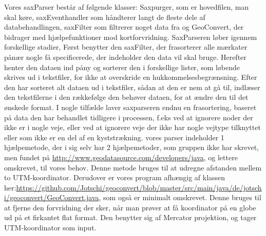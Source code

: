 Vores saxParser  består af følgende klasser: Saxpurger, som er hovedfilen, man skal køre, saxEventhandler som håndterer langt de fleste dele af databehandlingen, saxFilter som filtrerer noget data fra og GeoConvert, der bidrager med hjælpefunktioner mod kortforvridning. SaxParseren løber igennem forskellige stadier, Først benytter den saxFilter, der frasorterer alle mærkater pånær nogle få specificerede, der indeholder den data vil skal bruge. Herefter henter den dataen ind påny og sorterer den i forskellige lister, som løbende skrives ud i tekstfiler, for ikke at overskride en hukkommelsesbegrænsning. Efter den har sorteret alt dataen ud i tekstfiler, sådan at den er nem at gå til, indlæser den tekstfilerne i den rækkefølge den behøver dataen, for at ændre den til det ønskede format. I nogle tilfælde laver saxparseren endnu en frasortering, baseret på data den har behandlet tidligere i processen, f.eks ved at ignorere noder der ikke er i nogle veje, eller ved at ignorere veje der ikke har nogle vejtype tilknyttet eller som ikke er en del af en kyststrækning. vores parser indeholder 1 hjælpemetode, der i sig selv har 2 hjælpemetoder, som gruppen ikke har skrevet, men fundet på \url{http://www.geodatasource.com/developers/java}, og lettere omskrevet, til vores behov. Denne metode bruges til at udregne afstanden mellem to UTM-koordinator. Derudover er vores program afhængig af klassen her:\url{https://github.com/Jotschi/geoconvert/blob/master/src/main/java/de/jotschi/geoconvert/GeoConvert.java}, som også er minimalt omskrevet. Denne bruges til at fjerne den forvridning der sker, når man prøver at få koordinator på en globe ud på et firkantet flat format. Den benytter sig af Mercator projektion, og tager UTM-koordinator som input.